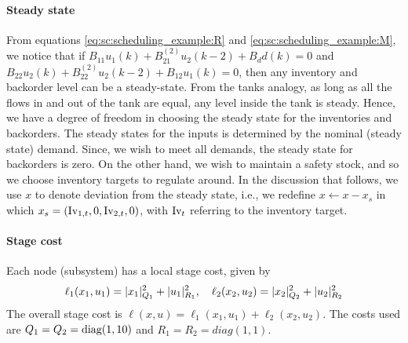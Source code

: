 \paragraph{Steady state} From equations
\eqref{eq:sc:scheduling_example:R} and
\eqref{eq:sc:scheduling_example:M}, we notice that if $B_{11}u_1(k) + B_{21}^{(2)}u_2(k-2)+B_dd(k) = 0$ and
$B_{22}u_2(k)+B_{22}^{(2)}u_2(k-2)+B_{12}u_1(k) = 0$, then any
inventory and backorder level can be a steady-state. From the tanks
analogy, as long as all the flows in and out of the tank are equal,
any level inside the tank is steady. Hence, we have a degree of
freedom in choosing the steady state for the inventories and backorders. The steady states
for the inputs is determined by the nominal (steady state) demand. Since, we wish to
meet all demands, the steady state for backorders is zero. On the
other hand, we wish to maintain a safety stock, and so we
choose inventory targets to regulate around. In the discussion that follows, we use
$x$ to denote deviation from the steady state, i.e., we redefine $x
\leftarrow x-x_s$ in which $x_s =
(\textrm{Iv}_{1,t},0,\textrm{Iv}_{2,t},0)$, with $\textrm{Iv}_t$ referring
to the inventory target.


\paragraph{Stage cost}
Each node (subsystem) has a local stage cost, given by
\begin{equation*}
\ell_1(x_1,u_1)  = \vert x_1 \vert^2_{Q_1} + \vert u_1 \vert^2_{R_1},\quad
\ell_2(x_2,u_2) = \vert x_2 \vert^2_{Q_2} + \vert u_2 \vert^2_{R_2}
\end{equation*}
The overall stage cost is $\ell(x,u) =
\ell_1(x_1,u_1)+\ell_2(x_2,u_2)$. The costs used are $Q_1=Q_2=
\text{diag}(1,10)$ and $R_1=R_2 = diag(1,1)$.

